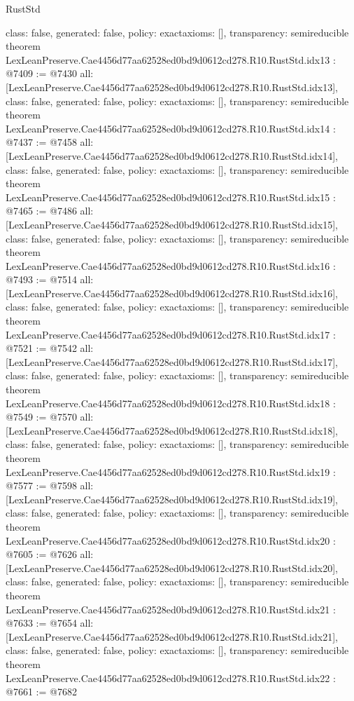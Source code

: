 \begin{lexlean}{RustStd}
\begin{coremodule}
{  class: false,
  generated: false,
  policy: exact{axioms: []},
  transparency: semireducible
}
theorem LexLeanPreserve.Cae4456d77aa62528ed0bd9d0612cd278.R10.RustStd.idx13 : @7409 := @7430 {
  all: [LexLeanPreserve.Cae4456d77aa62528ed0bd9d0612cd278.R10.RustStd.idx13],
  class: false,
  generated: false,
  policy: exact{axioms: []},
  transparency: semireducible
}
theorem LexLeanPreserve.Cae4456d77aa62528ed0bd9d0612cd278.R10.RustStd.idx14 : @7437 := @7458 {
  all: [LexLeanPreserve.Cae4456d77aa62528ed0bd9d0612cd278.R10.RustStd.idx14],
  class: false,
  generated: false,
  policy: exact{axioms: []},
  transparency: semireducible
}
theorem LexLeanPreserve.Cae4456d77aa62528ed0bd9d0612cd278.R10.RustStd.idx15 : @7465 := @7486 {
  all: [LexLeanPreserve.Cae4456d77aa62528ed0bd9d0612cd278.R10.RustStd.idx15],
  class: false,
  generated: false,
  policy: exact{axioms: []},
  transparency: semireducible
}
theorem LexLeanPreserve.Cae4456d77aa62528ed0bd9d0612cd278.R10.RustStd.idx16 : @7493 := @7514 {
  all: [LexLeanPreserve.Cae4456d77aa62528ed0bd9d0612cd278.R10.RustStd.idx16],
  class: false,
  generated: false,
  policy: exact{axioms: []},
  transparency: semireducible
}
theorem LexLeanPreserve.Cae4456d77aa62528ed0bd9d0612cd278.R10.RustStd.idx17 : @7521 := @7542 {
  all: [LexLeanPreserve.Cae4456d77aa62528ed0bd9d0612cd278.R10.RustStd.idx17],
  class: false,
  generated: false,
  policy: exact{axioms: []},
  transparency: semireducible
}
theorem LexLeanPreserve.Cae4456d77aa62528ed0bd9d0612cd278.R10.RustStd.idx18 : @7549 := @7570 {
  all: [LexLeanPreserve.Cae4456d77aa62528ed0bd9d0612cd278.R10.RustStd.idx18],
  class: false,
  generated: false,
  policy: exact{axioms: []},
  transparency: semireducible
}
theorem LexLeanPreserve.Cae4456d77aa62528ed0bd9d0612cd278.R10.RustStd.idx19 : @7577 := @7598 {
  all: [LexLeanPreserve.Cae4456d77aa62528ed0bd9d0612cd278.R10.RustStd.idx19],
  class: false,
  generated: false,
  policy: exact{axioms: []},
  transparency: semireducible
}
theorem LexLeanPreserve.Cae4456d77aa62528ed0bd9d0612cd278.R10.RustStd.idx20 : @7605 := @7626 {
  all: [LexLeanPreserve.Cae4456d77aa62528ed0bd9d0612cd278.R10.RustStd.idx20],
  class: false,
  generated: false,
  policy: exact{axioms: []},
  transparency: semireducible
}
theorem LexLeanPreserve.Cae4456d77aa62528ed0bd9d0612cd278.R10.RustStd.idx21 : @7633 := @7654 {
  all: [LexLeanPreserve.Cae4456d77aa62528ed0bd9d0612cd278.R10.RustStd.idx21],
  class: false,
  generated: false,
  policy: exact{axioms: []},
  transparency: semireducible
}
theorem LexLeanPreserve.Cae4456d77aa62528ed0bd9d0612cd278.R10.RustStd.idx22 : @7661 := @7682 {
}
\end{coremodule}
\end{lexlean}
